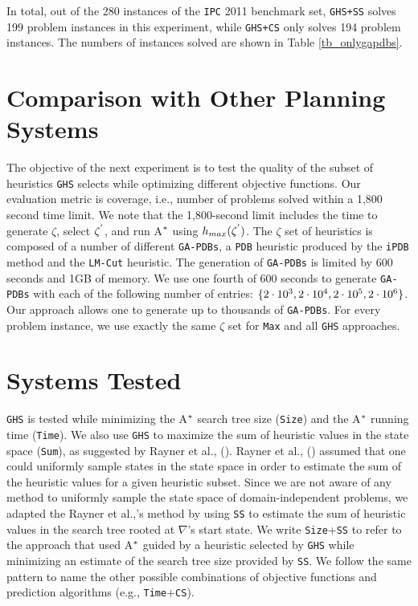 In total, out of the 280 instances of the \texttt{IPC} 2011 benchmark set, \texttt{GHS+SS} solves 199 problem instances in this experiment, while \texttt{GHS+CS} only solves 194 problem instances. The numbers of instances solved are shown in Table \ref{tb_onlygapdbs}.

\section{Comparison with Other Planning Systems}

\noindent
The objective of the next experiment is to test the quality of the subset of heuristics \texttt{GHS} selects while optimizing different objective functions. Our evaluation metric is coverage, i.e., number of problems solved within a 1,800 second time limit. We note that the 1,800-second limit includes the time to generate $\zeta$, select $\zeta\sp{'}$, and run A$\sp{*}$ using $h_{max}(\zeta\sp{'})$. The $\zeta$ set of heuristics is composed of a number of different \texttt{GA-PDBs}, a \texttt{PDB} heuristic produced by the \texttt{iPDB} method and the \texttt{LM-Cut} heuristic. The generation of \texttt{GA-PDBs} is limited by 600 seconds and 1GB of memory. We use one fourth of 600 seconds to generate \texttt{GA-PDBs} with each of the following number of entries: $\{2 \cdot 10\sp{3}, 2 \cdot 10\sp{4}, 2 \cdot 10\sp{5}, 2 \cdot 10\sp{6}\}$. Our approach allows one to generate up to thousands of \texttt{GA-PDBs}. For every problem instance, we use exactly the same $\zeta$ set for \texttt{Max} and all \texttt{GHS} approaches.

\section{Systems Tested}

\noindent
\texttt{GHS} is tested while minimizing the A$\sp{*}$ search tree size (\texttt{Size}) and the A$\sp{*}$ running time (\texttt{Time}). We also use \texttt{GHS} to maximize the sum of heuristic values in the state space (\texttt{Sum}), as suggested by Rayner et al., (\citeyear{raynersss13}). Rayner et al., (\citeyear{raynersss13}) assumed that one could uniformly sample states in the state space in order to estimate the sum of the heuristic values for a given heuristic subset. Since we are not aware of any method to uniformly sample the state space of domain-independent problems, we adapted the Rayner et al.,'s method by using \texttt{SS} to estimate the sum of heuristic values in the search tree rooted at $\nabla$'s start state. We write \texttt{Size}+\texttt{SS} to refer to the approach that used A$\sp{*}$ guided by a heuristic selected by \texttt{GHS} while minimizing an estimate of the search tree size provided by \texttt{SS}. We follow the same pattern to name the other possible combinations of objective functions and prediction algorithms (e.g., \texttt{Time}+\texttt{CS}).

